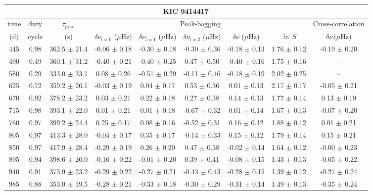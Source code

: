 \documentclass[twocolumn]{aastex61}%
\begin{document}
\begin{table*}[ht]\centering\fontsize{9.}{7.}\selectfont
\begin{tabular}{ccc|ccccc|c}
\multicolumn{9}{c}{KIC 9414417}\\ \hline\hline
time & duty & $\tau_\text{gran}$ &\multicolumn{5}{c|}{Peak-bagging}&Cross-correlation\\
(d)& cycle & (s)&$\delta\nu_{l=0}$ ($\mu$Hz) & $\delta\nu_{l=1}$ ($\mu$Hz) & $\delta\nu_{l=2}$ ($\mu$Hz) & $\delta\nu$ ($\mu$Hz)& $\ln\,S$ & $\delta\nu\,(\mu$Hz)\\\hline
445 & 0.98 & 362.5 $\pm$ 21.4 & -0.06 $\pm$ 0.18 & -0.30 $\pm$ 0.18 & -0.30 $\pm$ 0.36 & -0.18 $\pm$ 0.13 & 1.76 $\pm$ 0.12 & -0.19 $\pm$ 0.20\\
490 & 0.49 & 360.1 $\pm$ 31.2 & -0.40 $\pm$ 0.21 & -0.40 $\pm$ 0.25 & 0.47 $\pm$ 0.50 & -0.40 $\pm$ 0.16 & 1.75 $\pm$ 0.16 & --\\
580 & 0.29 & 333.0 $\pm$ 33.1 & 0.08 $\pm$ 0.26 & -0.51 $\pm$ 0.29 & -0.11 $\pm$ 0.46 & -0.18 $\pm$ 0.19 & 2.02 $\pm$ 0.25 & --\\
625 & 0.72 & 359.2 $\pm$ 26.1 & -0.03 $\pm$ 0.19 & 0.04 $\pm$ 0.17 & 0.53 $\pm$ 0.36 & 0.01 $\pm$ 0.13 & 2.17 $\pm$ 0.17 & -0.05 $\pm$ 0.21\\
670 & 0.92 & 378.2 $\pm$ 23.2 & 0.03 $\pm$ 0.21 & 0.22 $\pm$ 0.18 & 0.27 $\pm$ 0.38 & 0.14 $\pm$ 0.13 & 1.77 $\pm$ 0.14 & 0.13 $\pm$ 0.19\\
715 & 0.98 & 393.1 $\pm$ 22.0 & 0.01 $\pm$ 0.21 & 0.01 $\pm$ 0.18 & -0.67 $\pm$ 0.32 & 0.01 $\pm$ 0.14 & 1.67 $\pm$ 0.13 & -0.07 $\pm$ 0.20\\
760 & 0.97 & 399.2 $\pm$ 24.4 & 0.25 $\pm$ 0.17 & 0.08 $\pm$ 0.16 & -0.52 $\pm$ 0.31 & 0.16 $\pm$ 0.12 & 1.88 $\pm$ 0.12 & 0.01 $\pm$ 0.21\\
805 & 0.97 & 413.3 $\pm$ 28.0 & -0.04 $\pm$ 0.17 & 0.35 $\pm$ 0.17 & -0.14 $\pm$ 0.33 & 0.15 $\pm$ 0.12 & 1.79 $\pm$ 0.14 & 0.15 $\pm$ 0.21\\
850 & 0.97 & 417.9 $\pm$ 28.4 & -0.29 $\pm$ 0.19 & 0.26 $\pm$ 0.20 & 0.47 $\pm$ 0.38 & -0.02 $\pm$ 0.14 & 1.64 $\pm$ 0.12 & -0.00 $\pm$ 0.23\\
895 & 0.94 & 398.6 $\pm$ 26.0 & -0.16 $\pm$ 0.22 & -0.01 $\pm$ 0.20 & 0.39 $\pm$ 0.41 & -0.08 $\pm$ 0.15 & 1.43 $\pm$ 0.13 & -0.05 $\pm$ 0.22\\
940 & 0.91 & 373.9 $\pm$ 23.2 & -0.29 $\pm$ 0.22 & -0.27 $\pm$ 0.21 & -0.43 $\pm$ 0.43 & -0.28 $\pm$ 0.15 & 1.39 $\pm$ 0.12 & -0.27 $\pm$ 0.24\\
985 & 0.88 & 353.0 $\pm$ 19.5 & -0.28 $\pm$ 0.21 & -0.33 $\pm$ 0.18 & -0.30 $\pm$ 0.29 & -0.31 $\pm$ 0.14 & 1.49 $\pm$ 0.13 & -0.35 $\pm$ 0.24\\

\end{tabular}
\end{table*}
\end{document}
